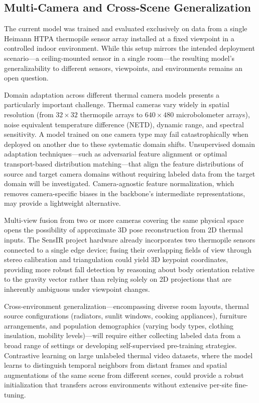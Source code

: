 \subsection{Multi-Camera and Cross-Scene Generalization}
\label{sec:outlook_generalization}

The current model was trained and evaluated exclusively on data from a single Heimann HTPA thermopile sensor array installed at a fixed viewpoint in a controlled indoor environment. While this setup mirrors the intended deployment scenario---a ceiling-mounted sensor in a single room---the resulting model's generalizability to different sensors, viewpoints, and environments remains an open question.

Domain adaptation across different thermal camera models presents a particularly important challenge. Thermal cameras vary widely in spatial resolution (from $32 \times 32$ thermopile arrays to $640 \times 480$ microbolometer arrays), noise equivalent temperature difference (NETD), dynamic range, and spectral sensitivity. A model trained on one camera type may fail catastrophically when deployed on another due to these systematic domain shifts. Unsupervised domain adaptation techniques---such as adversarial feature alignment or optimal transport-based distribution matching---that align the feature distributions of source and target camera domains without requiring labeled data from the target domain will be investigated. Camera-agnostic feature normalization, which removes camera-specific biases in the backbone's intermediate representations, may provide a lightweight alternative.

Multi-view fusion from two or more cameras covering the same physical space opens the possibility of approximate 3D pose reconstruction from 2D thermal inputs. The SensIR project hardware already incorporates two thermopile sensors connected to a single edge device; fusing their overlapping fields of view through stereo calibration and triangulation could yield 3D keypoint coordinates, providing more robust fall detection by reasoning about body orientation relative to the gravity vector rather than relying solely on 2D projections that are inherently ambiguous under viewpoint changes.

Cross-environment generalization---encompassing diverse room layouts, thermal source configurations (radiators, sunlit windows, cooking appliances), furniture arrangements, and population demographics (varying body types, clothing insulation, mobility levels)---will require either collecting labeled data from a broad range of settings or developing self-supervised pre-training strategies. Contrastive learning on large unlabeled thermal video datasets, where the model learns to distinguish temporal neighbors from distant frames and spatial augmentations of the same scene from different scenes, could provide a robust initialization that transfers across environments without extensive per-site fine-tuning.

